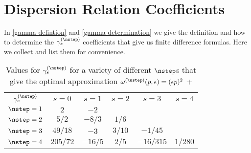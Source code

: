 \section{Dispersion Relation Coefficients}\label{sec:coefficients}

In \eqref{gamma defintion} and \eqref{gamma determination} we give the definition and how to determine the $\gamma_s^{(\nstep)}$ coefficients that give us finite difference formulas.  Here we collect and list them for convenience.

\begin{table}[ht]
    \caption{Values for $\gamma_s^{(\nstep)}$ for a variety of different $\nstep$s that give the optimal approximation $\omega^{(\nstep)}(p,\epsilon) = (\epsilon p)^2$ + }
    \label{tab:dispersion coefficients}
    \begin{tabular}{cccccc}
        $\gamma_s^{(\nstep)}$   &   $s=0$   &   $s=1$   &   $s=2$   &   $s=3$       &   $s=4$   \\
        $\nstep=1$              &   $2$     &   $-2$    &           &               &           \\
        $\nstep=2$              &   $5/2$   &   $-8/3$  &   $1/6$   &               &           \\
        $\nstep=3$              &   $49/18$ &   $-3$    &   $3/10$  &   $-1/45$     &           \\
        $\nstep=4$              &   $205/72$&   $-16/5$ &   $2/5$   &   $-16/315$   &   $1/280$
    \end{tabular}
\end{table}
